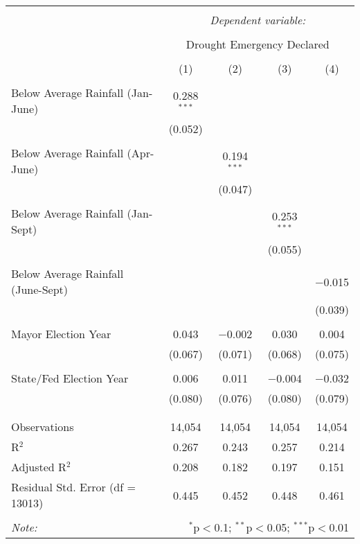 
\begin{tabular}{@{\extracolsep{5pt}}lcccc} 
\\[-1.8ex]\hline 
\hline \\[-1.8ex] 
 & \multicolumn{4}{c}{\textit{Dependent variable:}} \\ 
\cline{2-5} 
\\[-1.8ex] & \multicolumn{4}{c}{Drought Emergency Declared} \\ 
\\[-1.8ex] & (1) & (2) & (3) & (4)\\ 
\hline \\[-1.8ex] 
 Below Average Rainfall (Jan-June) & 0.288$^{***}$ &  &  &  \\ 
  & (0.052) &  &  &  \\ 
  & & & & \\ 
 Below Average Rainfall (Apr-June) &  & 0.194$^{***}$ &  &  \\ 
  &  & (0.047) &  &  \\ 
  & & & & \\ 
 Below Average Rainfall (Jan-Sept) &  &  & 0.253$^{***}$ &  \\ 
  &  &  & (0.055) &  \\ 
  & & & & \\ 
 Below Average Rainfall (June-Sept) &  &  &  & $-$0.015 \\ 
  &  &  &  & (0.039) \\ 
  & & & & \\ 
 Mayor Election Year & 0.043 & $-$0.002 & 0.030 & 0.004 \\ 
  & (0.067) & (0.071) & (0.068) & (0.075) \\ 
  & & & & \\ 
 State/Fed Election Year & 0.006 & 0.011 & $-$0.004 & $-$0.032 \\ 
  & (0.080) & (0.076) & (0.080) & (0.079) \\ 
  & & & & \\ 
\hline \\[-1.8ex] 
Observations & 14,054 & 14,054 & 14,054 & 14,054 \\ 
R$^{2}$ & 0.267 & 0.243 & 0.257 & 0.214 \\ 
Adjusted R$^{2}$ & 0.208 & 0.182 & 0.197 & 0.151 \\ 
Residual Std. Error (df = 13013) & 0.445 & 0.452 & 0.448 & 0.461 \\ 
\hline 
\hline \\[-1.8ex] 
\textit{Note:}  & \multicolumn{4}{r}{$^{*}$p$<$0.1; $^{**}$p$<$0.05; $^{***}$p$<$0.01} \\ 
\end{tabular} 
